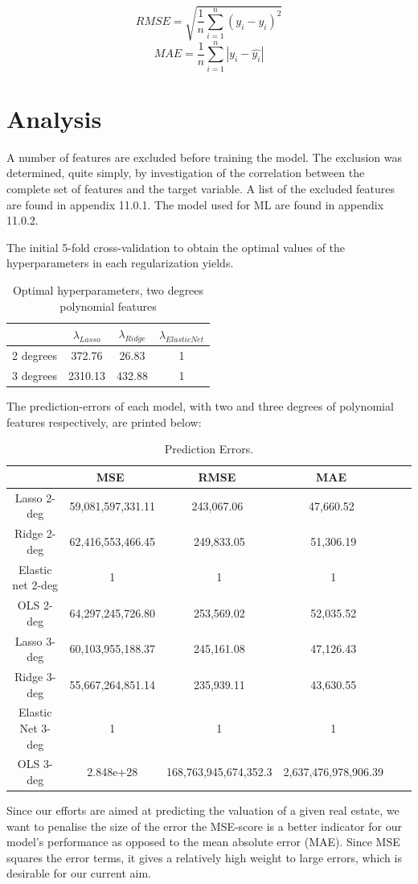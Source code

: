\documentclass[12pt,a4paper]{article}
\begin{document}
$$ RMSE = \sqrt{\frac{1}{n}\sum_{i=1}^{n}(y_i-\hat{y_i})^2}$$
$$ MAE = \frac{1}{n}\sum_{i=1}^{n}|y_i-\hat{y_i}|$$



\section{Analysis}
A number of features are excluded before training the model. The exclusion was determined, quite simply, by investigation of the correlation between the complete set of features and the target variable. A list of the excluded features are found in appendix 11.0.1. The model used for ML are found in appendix 11.0.2.  

The initial 5-fold cross-validation to obtain the optimal values of the hyperparameters in each regularization yields. 
\begin{table}[h!]
\begin{center}
\caption{Optimal hyperparameters, two degrees polynomial features\label{time}}
\begin{tabular}{ c | c  c  c } 
  & $\lambda_{Lasso}$ & $\lambda_{Ridge}$ &  $\lambda_{Elastic Net}$ \\ \hline
2 degrees  & 372.76 & 26.83 & 1 \\ \hline
3 degrees  & 2310.13 & 432.88 & 1
\end{tabular}
\end{center}
\end{table} 

The prediction-errors of each model, with two and three degrees of polynomial features respectively, are printed below:
\begin{table}[H]
\begin{center}
\caption{Prediction Errors. \label{time}}
\begin{tabular}{| c | c | c | c | c | c |} 
\hline
   & \ MSE \ & \, RMSE \ & \ MAE \ \\ \hline
   Lasso 2-deg & 59,081,597,331.11 & \ 243,067.06 \  & \ 47,660.52 \ \\ 
  Ridge 2-deg & 62,416,553,466.45 & 249,833.05 & 51,306.19  \\ 
  Elastic net 2-deg & 1 & 1 & 1  \\ 
  OLS 2-deg & 64,297,245,726.80 & 253,569.02 & 52,035.52  \\ \hline 
  Lasso 3-deg & 60,103,955,188.37 & 245,161.08 & 47,126.43  \\ 
  Ridge 3-deg & 55,667,264,851.14 & 235,939.11 & 43,630.55  \\ 
  Elastic Net 3-deg & 1 & 1 & 1  \\
  OLS 3-deg & 2.848e+28 & 168,763,945,674,352.3 & 2,637,476,978,906.39  \\ \hline
\end{tabular}
\end{center}
\end{table}
Since our efforts are aimed at predicting the valuation of a given real estate, we want to penalise the size of the error the MSE-score is a better indicator for our model's performance as opposed to the mean absolute error (MAE). Since MSE squares the error terms, it gives a relatively high weight to large errors, which is desirable for our current aim. 
\end{document}
